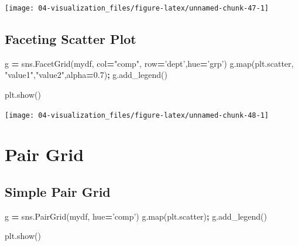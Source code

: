 \documentclass[
]{book}
\newenvironment{Shaded}{\begin{snugshade}}{\end{snugshade}}
\newcommand{\BuiltInTok}[1]{#1}
\newcommand{\FloatTok}[1]{\textcolor[rgb]{0.06,0.06,0.06}{#1}}
\newcommand{\NormalTok}[1]{#1}
\newcommand{\OperatorTok}[1]{\textcolor[rgb]{0.43,0.43,0.43}{\textbf{#1}}}
\newcommand{\StringTok}[1]{\textcolor[rgb]{0.5,0.5,0.5}{#1}}
\begin{document}
\texttt{[image: 04-visualization\_files/figure-latex/unnamed-chunk-47-1]}

\hypertarget{faceting-scatter-plot}{%
\subsection{Faceting Scatter Plot}\label{faceting-scatter-plot}}

\begin{Shaded}
\begin{Highlighting}[]
\NormalTok{g }\OperatorTok{=}\NormalTok{ sns.FacetGrid(mydf, col}\OperatorTok{=}\StringTok{"comp"}\NormalTok{, row}\OperatorTok{=}\StringTok{'dept'}\NormalTok{,hue}\OperatorTok{=}\StringTok{'grp'}\NormalTok{)}
\NormalTok{g.}\BuiltInTok{map}\NormalTok{(plt.scatter, }\StringTok{"value1"}\NormalTok{,}\StringTok{"value2"}\NormalTok{,alpha}\OperatorTok{=}\FloatTok{0.7}\NormalTok{)}\OperatorTok{;}
\NormalTok{g.add_legend()}
\end{Highlighting}
\end{Shaded}

\begin{Shaded}
\begin{Highlighting}[]
\NormalTok{plt.show()}
\end{Highlighting}
\end{Shaded}

\texttt{[image: 04-visualization\_files/figure-latex/unnamed-chunk-48-1]}

\hypertarget{pair-grid}{%
\section{Pair Grid}\label{pair-grid}}

\hypertarget{simple-pair-grid}{%
\subsection{Simple Pair Grid}\label{simple-pair-grid}}

\begin{Shaded}
\begin{Highlighting}[]
\NormalTok{g }\OperatorTok{=}\NormalTok{ sns.PairGrid(mydf, hue}\OperatorTok{=}\StringTok{'comp'}\NormalTok{)}
\NormalTok{g.}\BuiltInTok{map}\NormalTok{(plt.scatter)}\OperatorTok{;}
\NormalTok{g.add_legend()}
\end{Highlighting}
\end{Shaded}

\begin{Shaded}
\begin{Highlighting}[]
\NormalTok{plt.show()}
\end{Highlighting}
\end{Shaded}
\end{document}

